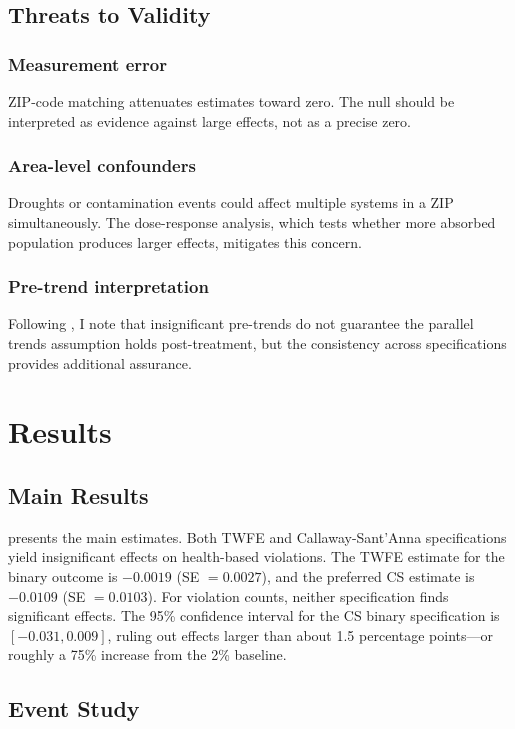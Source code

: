 \documentclass[12pt]{article}
\begin{document}
\subsection{Threats to Validity}

\subsubsection*{Measurement error} ZIP-code matching attenuates estimates toward zero. The null should be interpreted as evidence against large effects, not as a precise zero. \subsubsection*{Area-level confounders} Droughts or contamination events could affect multiple systems in a ZIP simultaneously. The dose-response analysis, which tests whether more absorbed population produces larger effects, mitigates this concern. \subsubsection*{Pre-trend interpretation} Following \citet{roth2023pretest}, I note that insignificant pre-trends do not guarantee the parallel trends assumption holds post-treatment, but the consistency across specifications provides additional assurance.


\section{Results}

\subsection{Main Results}



 presents the main estimates. Both TWFE and Callaway-Sant'Anna specifications yield insignificant effects on health-based violations. The TWFE estimate for the binary outcome is $-0.0019$ (SE $= 0.0027$), and the preferred CS estimate is $-0.0109$ (SE $= 0.0103$). For violation counts, neither specification finds significant effects. The 95\% confidence interval for the CS binary specification is $[-0.031, 0.009]$, ruling out effects larger than about 1.5 percentage points---or roughly a 75\% increase from the 2\% baseline.

\subsection{Event Study}
\end{document}
